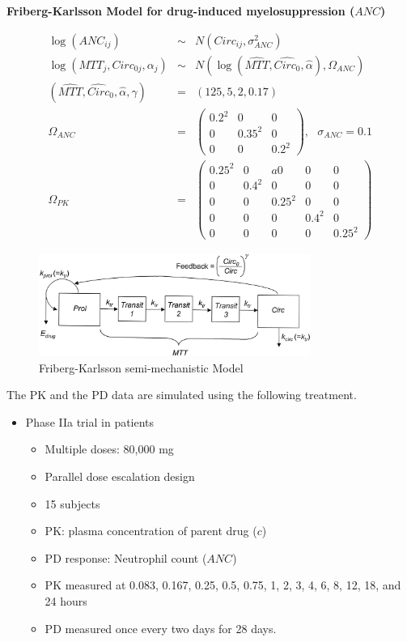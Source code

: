 \documentclass[11pt]{amsart}
\begin{document}
{\bf Friberg-Karlsson Model for drug-induced myelosuppression ($ANC$)}

\begin{eqnarray*}
\log(ANC_{ij}) &\sim& N(Circ_{ij}, \sigma^2_{ANC}) \\
\log\left(MTT_j, Circ_{0j}, \alpha_j\right) &\sim& N\left(\log\left(\widehat{MTT}, \widehat{Circ_0}, \widehat{\alpha}\right), \Omega_{ANC}\right) \\
\left(\widehat{MTT}, \widehat{Circ}_0,\widehat{\alpha}, \gamma \right) &=& \left(125, 5, 2, 0.17\right) \\
\Omega_{ANC} &=& \left(\begin{array}{ccc} 0.2^2 & 0 & 0 \\ 0 & 0.35^2 & 0 \\ 0 & 0 & 0.2^2 \end{array}\right), \ \ \ \sigma_{ANC} = 0.1 \\
\Omega_{PK} &=& \left(\begin{array}{ccccc} 0.25^2 & 0 &a 0 & 0 & 0 \\ 0 & 0.4^2 & 0 & 0 & 0 \\
0 & 0 & 0.25^2 & 0 & 0 \\ 0 & 0 & 0 & 0.4^2 & 0 \\ 0 & 0 & 0 & 0 & 0.25^2  \end{array}\right)
\end{eqnarray*}

\begin{figure}[htbp]
\includegraphics[width=3.5in,trim=0in 0in 0 0in]{graphics/neutrophilModel.jpg}
\caption{Friberg-Karlsson semi-mechanistic Model \cite{2364}}
\label{FK}
\end{figure}

The PK and the PD data are simulated using the following treatment.
\begin{itemize}
  \item Phase IIa trial in patients
  \begin{itemize}
    \item Multiple doses: 80,000 mg
    \item Parallel dose escalation design
    \item 15 subjects
    \item PK: plasma concentration of parent drug ($c$)
    \item PD response: Neutrophil count ($ANC$)
    \item PK measured at 0.083, 0.167, 0.25, 0.5, 0.75, 1, 2, 3, 4, 6, 8, 12, 18, and 24 hours
    \item PD measured once every two days for 28 days.
  \end{itemize}
\end{itemize}
\end{document}

